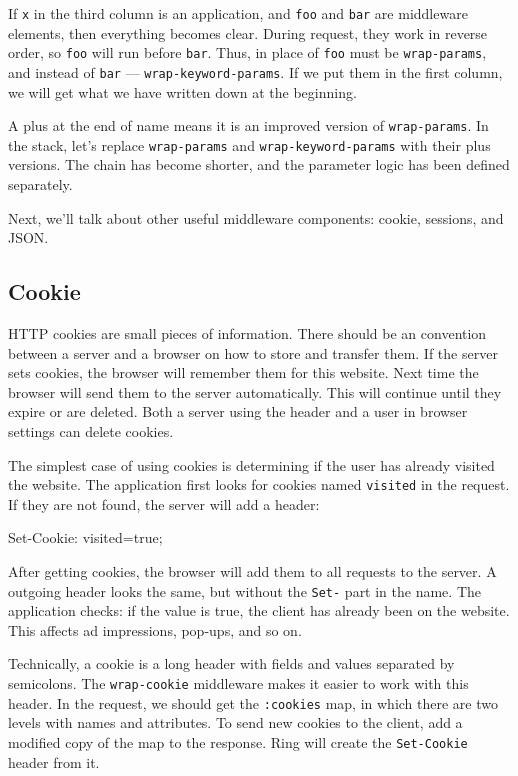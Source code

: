 \fi

If \verb|x| in the third column is an application, and \verb|foo| and \verb|bar| are middleware elements, then everything becomes clear. During request, they work in reverse order, so \verb|foo| will run before \verb|bar|. Thus, in place of \verb|foo| must be \verb|wrap-params|, and instead of \verb|bar| — \verb|wrap-keyword-params|. If we put them in the first column, we will get what we have written down at the beginning.

A plus at the end of name means it is an improved version of \verb|wrap-params|. In the stack, let's replace \verb|wrap-params| and \verb|wrap-keyword-params| with their
plus versions. The chain has become shorter, and the parameter logic has been defined separately.

Next, we'll talk about other useful middleware components: cookie, sessions, and JSON.

\subsection{Cookie}


HTTP cookies are small pieces of information. There should be an convention between a server and a browser on how to store and transfer them. If the server sets cookies,
the browser will remember them for this website. Next time the browser will send them to the server automatically. This will continue until they expire or are deleted. Both a server using the header and a user in browser settings can delete cookies.

The simplest case of using cookies is determining if the user has already visited the website. The application first looks for cookies named \verb|visited| in the request. If they are not found, the server will add a header:

\begin{english}
\begin{http}
Set-Cookie: visited=true;
\end{http}
\end{english}

After getting cookies, the browser will add them to all requests to the server. A outgoing header looks the same, but without the \verb|Set-| part in the name. The application checks: if the value is true, the client has already been on the website. This affects ad impressions, pop-ups, and so on.

Technically, a cookie is a long header with fields and values separated by semicolons. The \verb|wrap-cookie| middleware makes it easier to work with this header. In the request, we should get the \verb|:cookies| map, in which there are two levels with names and attributes. To send new cookies to the client, add a modified copy of the map to the response. Ring will create the \verb|Set-Cookie| header from it.

